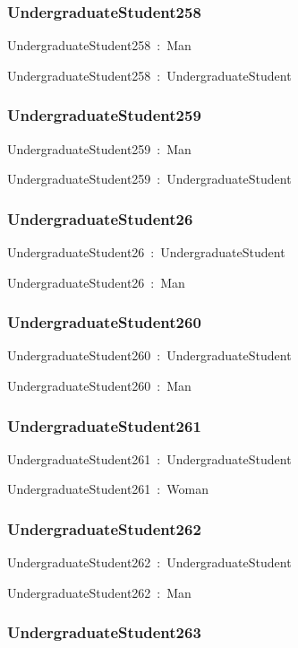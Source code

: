 \documentclass{article}
\begin{document}
\subsubsection*{UndergraduateStudent258}

UndergraduateStudent258~:~Man

UndergraduateStudent258~:~UndergraduateStudent

\subsubsection*{UndergraduateStudent259}

UndergraduateStudent259~:~Man

UndergraduateStudent259~:~UndergraduateStudent

\subsubsection*{UndergraduateStudent26}

UndergraduateStudent26~:~UndergraduateStudent

UndergraduateStudent26~:~Man

\subsubsection*{UndergraduateStudent260}

UndergraduateStudent260~:~UndergraduateStudent

UndergraduateStudent260~:~Man

\subsubsection*{UndergraduateStudent261}

UndergraduateStudent261~:~UndergraduateStudent

UndergraduateStudent261~:~Woman

\subsubsection*{UndergraduateStudent262}

UndergraduateStudent262~:~UndergraduateStudent

UndergraduateStudent262~:~Man

\subsubsection*{UndergraduateStudent263}
\end{document}
